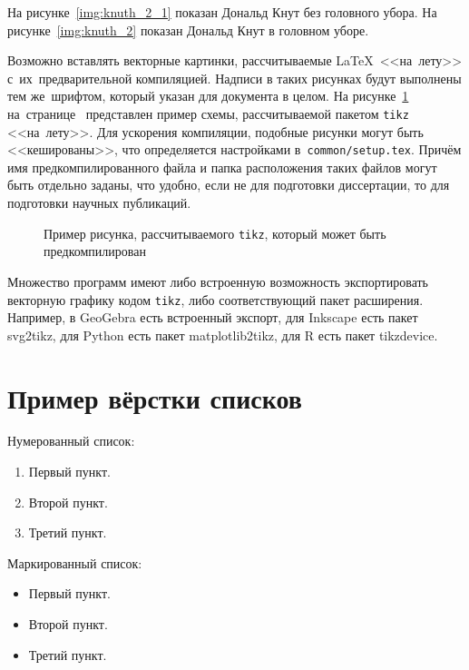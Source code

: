 На рисунке~\ref{img:knuth_2_1} показан Дональд Кнут без головного убора. На рисунке~\ref{img:knuth_2}  показан Дональд Кнут в головном уборе.

Возможно вставлять векторные картинки, рассчитываемые \LaTeX\ <<на~лету>>
с~их~предварительной компиляцией. Надписи в таких рисунках будут выполнены
тем же~шрифтом, который указан для документа в целом.
На рисунке~\ref{img:tikz_example} на~странице~\pageref{img:tikz_example} представлен пример схемы, рассчитываемой пакетом \verb|tikz| <<на~лету>>.
Для ускорения компиляции, подобные рисунки могут быть <<кешированы>>, что
определяется настройками в~\verb|common/setup.tex|.
Причём имя предкомпилированного
файла и папка расположения таких файлов могут быть отдельно заданы,
что удобно, если не для подготовки диссертации,
то для подготовки научных публикаций.
\begin{figure}[ht]
    {\centering
        

    }
    \legend{}
    \caption[Пример \texttt{tikz} схемы]{Пример рисунка, рассчитываемого
        \texttt{tikz}, который может быть предкомпилирован}
    \label{img:tikz_example}
\end{figure}

Множество программ имеют либо встроенную возможность экспортировать векторную
графику кодом \verb|tikz|, либо соответствующий пакет расширения.
Например, в GeoGebra есть встроенный экспорт,
для Inkscape есть пакет svg2tikz,
для Python есть пакет matplotlib2tikz,
для R есть пакет tikzdevice.


\section{Пример вёрстки списков} \label{sect2_3}

\noindent Нумерованный список:
\begin{enumerate}
  \item Первый пункт.
  \item Второй пункт.
  \item Третий пункт.
\end{enumerate}

\noindent Маркированный список:
\begin{itemize}
  \item Первый пункт.
  \item Второй пункт.
  \item Третий пункт.
\end{itemize}

